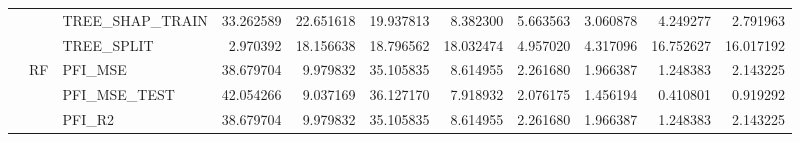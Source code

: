 \begin{table}
\begin{tabular}{lllrrrrrrrr}
 &  & TREE\_SHAP\_TRAIN & {\cellcolor[HTML]{B40426}} \color[HTML]{F1F1F1} 33.262589 & {\cellcolor[HTML]{F6BDA2}} \color[HTML]{000000} 22.651618 & {\cellcolor[HTML]{ECD3C5}} \color[HTML]{000000} 19.937813 & {\cellcolor[HTML]{7597F6}} \color[HTML]{F1F1F1} 8.382300 & {\cellcolor[HTML]{5875E1}} \color[HTML]{F1F1F1} 5.663563 & {\cellcolor[HTML]{3D50C3}} \color[HTML]{F1F1F1} 3.060878 & {\cellcolor[HTML]{4961D2}} \color[HTML]{F1F1F1} 4.249277 & {\cellcolor[HTML]{3B4CC0}} \color[HTML]{F1F1F1} 2.791963 \\
 &  & TREE\_SPLIT & {\cellcolor[HTML]{3B4CC0}} \color[HTML]{F1F1F1} 2.970392 & {\cellcolor[HTML]{C32E31}} \color[HTML]{F1F1F1} 18.156638 & {\cellcolor[HTML]{B40426}} \color[HTML]{F1F1F1} 18.796562 & {\cellcolor[HTML]{C53334}} \color[HTML]{F1F1F1} 18.032474 & {\cellcolor[HTML]{6282EA}} \color[HTML]{F1F1F1} 4.957020 & {\cellcolor[HTML]{5470DE}} \color[HTML]{F1F1F1} 4.317096 & {\cellcolor[HTML]{DF634E}} \color[HTML]{F1F1F1} 16.752627 & {\cellcolor[HTML]{E9785D}} \color[HTML]{F1F1F1} 16.017192 \\
\cline{2-11}
 & \multirow[c]{8}{*}{RF} & PFI\_MSE & {\cellcolor[HTML]{B40426}} \color[HTML]{F1F1F1} 38.679704 & {\cellcolor[HTML]{86A9FC}} \color[HTML]{F1F1F1} 9.979832 & {\cellcolor[HTML]{D55042}} \color[HTML]{F1F1F1} 35.105835 & {\cellcolor[HTML]{7A9DF8}} \color[HTML]{F1F1F1} 8.614955 & {\cellcolor[HTML]{4257C9}} \color[HTML]{F1F1F1} 2.261680 & {\cellcolor[HTML]{3F53C6}} \color[HTML]{F1F1F1} 1.966387 & {\cellcolor[HTML]{3B4CC0}} \color[HTML]{F1F1F1} 1.248383 & {\cellcolor[HTML]{4257C9}} \color[HTML]{F1F1F1} 2.143225 \\
 &  & PFI\_MSE\_TEST & {\cellcolor[HTML]{B40426}} \color[HTML]{F1F1F1} 42.054266 & {\cellcolor[HTML]{7EA1FA}} \color[HTML]{F1F1F1} 9.037169 & {\cellcolor[HTML]{E26952}} \color[HTML]{F1F1F1} 36.127170 & {\cellcolor[HTML]{7597F6}} \color[HTML]{F1F1F1} 7.918932 & {\cellcolor[HTML]{465ECF}} \color[HTML]{F1F1F1} 2.076175 & {\cellcolor[HTML]{4257C9}} \color[HTML]{F1F1F1} 1.456194 & {\cellcolor[HTML]{3B4CC0}} \color[HTML]{F1F1F1} 0.410801 & {\cellcolor[HTML]{3E51C5}} \color[HTML]{F1F1F1} 0.919292 \\
 &  & PFI\_R2 & {\cellcolor[HTML]{B40426}} \color[HTML]{F1F1F1} 38.679704 & {\cellcolor[HTML]{86A9FC}} \color[HTML]{F1F1F1} 9.979832 & {\cellcolor[HTML]{D55042}} \color[HTML]{F1F1F1} 35.105835 & {\cellcolor[HTML]{7A9DF8}} \color[HTML]{F1F1F1} 8.614955 & {\cellcolor[HTML]{4257C9}} \color[HTML]{F1F1F1} 2.261680 & {\cellcolor[HTML]{3F53C6}} \color[HTML]{F1F1F1} 1.966387 & {\cellcolor[HTML]{3B4CC0}} \color[HTML]{F1F1F1} 1.248383 & {\cellcolor[HTML]{4257C9}} \color[HTML]{F1F1F1} 2.143225 \\

\end{tabular}
\end{table}
